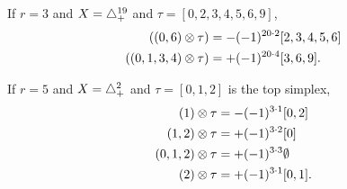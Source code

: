 \begin{example}\label{example:first3'}
	If $r=3$ and $X=\triangle_{+}^{19}$ and $\tau = [0,2,3,4,5,6,9]$,
	\begin{align*}
		((0,6) \otimes \tau) &= -(-1)^{20\cdot 2} [2,3,4,5,6]
		\\
		((0,1,3,4) \otimes \tau) &= +(-1)^{20\cdot 4}[3,6,9].
	\end{align*}
\end{example}

\begin{example}\label{example:first5}
	If $r=5$ and $X=\triangle_{+}^2$ and $\tau = [0,1,2]$ is the top simplex,
	\[
	\begin{split}
	(1) \otimes \tau &= - (-1)^{3\cdot 1} [0,2]
	\\
	(1,2) \otimes \tau &= +(-1)^{3\cdot 2} [0]
	\\
	(0,1,2) \otimes \tau &= +(-1)^{3\cdot 3}\emptyset
	\\
	(2) \otimes \tau &= +(-1)^{3\cdot 1} [0,1].
	\end{split}
	\]
\end{example}

